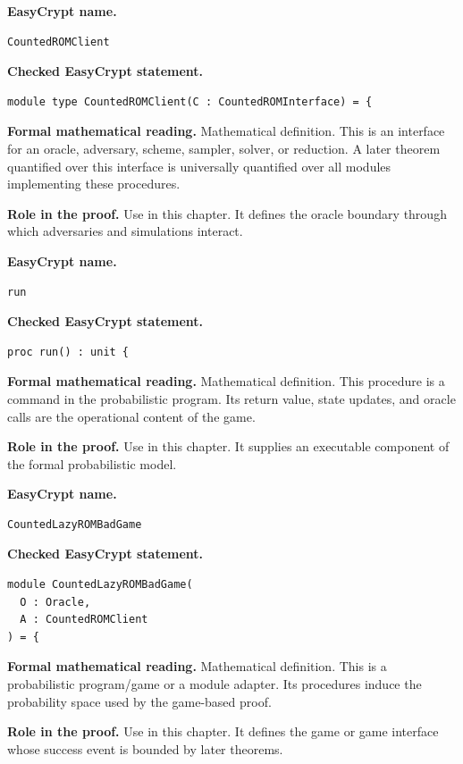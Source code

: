 \begin{formaldefinition}
\noindent\textbf{EasyCrypt name.}
\begin{lstlisting}[language=EasyCrypt,basicstyle=\ttfamily\scriptsize]
CountedROMClient
\end{lstlisting}
\noindent\textbf{Checked EasyCrypt statement.}
\begin{lstlisting}[language=EasyCrypt,basicstyle=\ttfamily\scriptsize]
module type CountedROMClient(C : CountedROMInterface) = {
\end{lstlisting}
\noindent\textbf{Formal mathematical reading.}
Mathematical definition. This is an interface for an oracle, adversary, scheme, sampler, solver, or reduction.  A later theorem quantified over this interface is universally quantified over all modules implementing these procedures.

\noindent\textbf{Role in the proof.}
Use in this chapter. It defines the oracle boundary through which adversaries and simulations interact.

\end{formaldefinition}

\begin{formaldefinition}
\noindent\textbf{EasyCrypt name.}
\begin{lstlisting}[language=EasyCrypt,basicstyle=\ttfamily\scriptsize]
run
\end{lstlisting}
\noindent\textbf{Checked EasyCrypt statement.}
\begin{lstlisting}[language=EasyCrypt,basicstyle=\ttfamily\scriptsize]
proc run() : unit {
\end{lstlisting}
\noindent\textbf{Formal mathematical reading.}
Mathematical definition. This procedure is a command in the probabilistic program.  Its return value, state updates, and oracle calls are the operational content of the game.

\noindent\textbf{Role in the proof.}
Use in this chapter. It supplies an executable component of the formal probabilistic model.

\end{formaldefinition}

\begin{formaldefinition}
\noindent\textbf{EasyCrypt name.}
\begin{lstlisting}[language=EasyCrypt,basicstyle=\ttfamily\scriptsize]
CountedLazyROMBadGame
\end{lstlisting}
\noindent\textbf{Checked EasyCrypt statement.}
\begin{lstlisting}[language=EasyCrypt,basicstyle=\ttfamily\scriptsize]
module CountedLazyROMBadGame(
  O : Oracle,
  A : CountedROMClient
) = {
\end{lstlisting}
\noindent\textbf{Formal mathematical reading.}
Mathematical definition. This is a probabilistic program/game or a module adapter.  Its procedures induce the probability space used by the game-based proof.

\noindent\textbf{Role in the proof.}
Use in this chapter. It defines the game or game interface whose success event is bounded by later theorems.

\end{formaldefinition}


